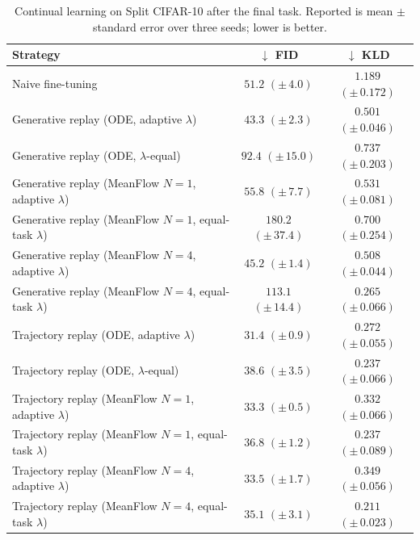 \begin{table}[t]
\centering
\caption{Continual learning on Split CIFAR-10 after the final task. Reported is mean {\scriptsize$\pm$} standard error over three seeds; lower is better.}
\label{tab:cifar10_cl_fm}
\begin{tabular}{lcc}
\toprule
Strategy & $\downarrow$ FID & $\downarrow$ KLD \\
\midrule
Naive fine-tuning & $51.2$ {\scriptsize $(\pm\,4.0)$} & $1.189$ {\scriptsize $(\pm\,0.172)$} \\
\midrule
Generative replay (ODE, adaptive $\lambda$) & $43.3$ {\scriptsize $(\pm\,2.3)$} & $0.501$ {\scriptsize $(\pm\,0.046)$} \\
Generative replay (ODE, $\lambda$-equal) & $92.4$ {\scriptsize $(\pm\,15.0)$} & $0.737$ {\scriptsize $(\pm\,0.203)$} \\
\midrule
Generative replay (MeanFlow $N{=}1$, adaptive $\lambda$) & $55.8$ {\scriptsize $(\pm\,7.7)$} & $0.531$ {\scriptsize $(\pm\,0.081)$} \\
Generative replay (MeanFlow $N{=}1$, equal-task $\lambda$) & $180.2$ {\scriptsize $(\pm\,37.4)$} & $0.700$ {\scriptsize $(\pm\,0.254)$} \\
Generative replay (MeanFlow $N{=}4$, adaptive $\lambda$) & $45.2$ {\scriptsize $(\pm\,1.4)$} & $0.508$ {\scriptsize $(\pm\,0.044)$} \\
Generative replay (MeanFlow $N{=}4$, equal-task $\lambda$) & $113.1$ {\scriptsize $(\pm\,14.4)$} & $0.265$ {\scriptsize $(\pm\,0.066)$} \\
\midrule
Trajectory replay (ODE, adaptive $\lambda$) & $31.4$ {\scriptsize $(\pm\,0.9)$} & $0.272$ {\scriptsize $(\pm\,0.055)$} \\
Trajectory replay (ODE, $\lambda$-equal) & $38.6$ {\scriptsize $(\pm\,3.5)$} & $0.237$ {\scriptsize $(\pm\,0.066)$} \\
\midrule
Trajectory replay (MeanFlow $N{=}1$, adaptive $\lambda$) & $33.3$ {\scriptsize $(\pm\,0.5)$} & $0.332$ {\scriptsize $(\pm\,0.066)$} \\
Trajectory replay (MeanFlow $N{=}1$, equal-task $\lambda$) & $36.8$ {\scriptsize $(\pm\,1.2)$} & $0.237$ {\scriptsize $(\pm\,0.089)$} \\
Trajectory replay (MeanFlow $N{=}4$, adaptive $\lambda$) & $33.5$ {\scriptsize $(\pm\,1.7)$} & $0.349$ {\scriptsize $(\pm\,0.056)$} \\
Trajectory replay (MeanFlow $N{=}4$, equal-task $\lambda$) & $35.1$ {\scriptsize $(\pm\,3.1)$} & $0.211$ {\scriptsize $(\pm\,0.023)$} \\
\bottomrule
\end{tabular}
\end{table}

